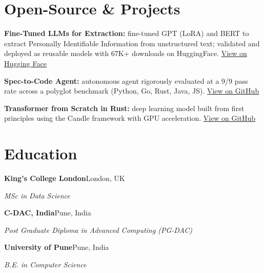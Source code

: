 \documentclass[10pt,a4paper]{article}
\begin{document}
\section{Open-Source \& Projects}
\begin{tight}
  \item \textbf{Fine-Tuned LLMs for Extraction:} fine-tuned GPT (LoRA) and BERT to extract Personally Identifiable Information from unstructured text; validated and deployed as reusable models with 67K+ downloads on HuggingFace. \href{https://huggingface.co/ab-ai/pii_model}{View on Hugging Face}
  \item \textbf{Spec-to-Code Agent:} autonomous agent rigorously evaluated at a 9/9 pass rate across a polyglot benchmark (Python, Go, Rust, Java, JS). \href{https://github.com/abhijeetscode/Spec-to-Code-Agent}{View on GitHub}
  \item \textbf{Transformer from Scratch in Rust:} deep learning model built from first principles using the Candle framework with GPU acceleration. \href{https://github.com/abhijeetscode/transformer-rust}{View on GitHub}
\end{tight}

\section{Education}
{\color{company}\bfseries King's College London}\hfill {\color{muted}London, UK}\par
{\itshape MSc in Data Science}\par\vspace{2pt}
{\color{company}\bfseries C-DAC, India}\hfill {\color{muted}Pune, India}\par
{\itshape Post Graduate Diploma in Advanced Computing (PG-DAC)}\par\vspace{2pt}
{\color{company}\bfseries University of Pune}\hfill {\color{muted}Pune, India}\par
{\itshape B.E. in Computer Science}\par
\end{document}
